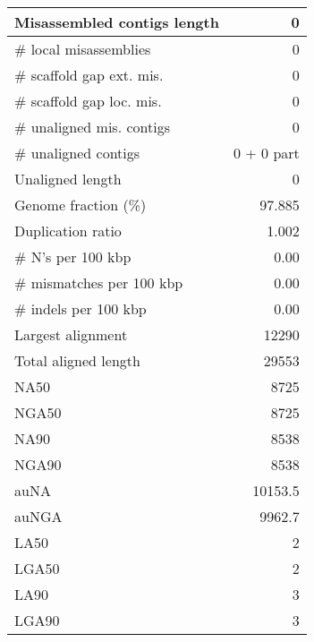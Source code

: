\documentclass[12pt,a4paper]{article}
\begin{document}
\begin{table}[ht]
\begin{center}
\begin{tabular}{|l*{1}{|r}|}
Misassembled contigs length & 0 \\ \hline
\# local misassemblies & 0 \\ \hline
\# scaffold gap ext. mis. & 0 \\ \hline
\# scaffold gap loc. mis. & 0 \\ \hline
\# unaligned mis. contigs & 0 \\ \hline
\# unaligned contigs & 0 + 0 part \\ \hline
Unaligned length & 0 \\ \hline
Genome fraction (\%) & 97.885 \\ \hline
Duplication ratio & 1.002 \\ \hline
\# N's per 100 kbp & 0.00 \\ \hline
\# mismatches per 100 kbp & 0.00 \\ \hline
\# indels per 100 kbp & 0.00 \\ \hline
Largest alignment & 12290 \\ \hline
Total aligned length & 29553 \\ \hline
NA50 & 8725 \\ \hline
NGA50 & 8725 \\ \hline
NA90 & 8538 \\ \hline
NGA90 & 8538 \\ \hline
auNA & 10153.5 \\ \hline
auNGA & 9962.7 \\ \hline
LA50 & 2 \\ \hline
LGA50 & 2 \\ \hline
LA90 & 3 \\ \hline
LGA90 & 3 \\ \hline
\end{tabular}
\end{center}
\end{table}
\end{document}

